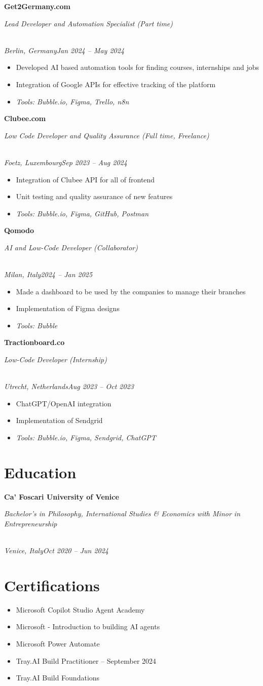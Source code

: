 \documentclass[a4paper,10pt]{article}
\newcommand{\role}[4]{\vspace{3pt}\noindent\hspace{0.6em}\parbox[t]{0.38\textwidth}{\raggedright\textbf{#1}}\hfill\parbox[t]{0.58\textwidth}{\raggedleft\textit{#2}}\\{\textit{#3}\hfill\textit{#4}}\vspace{1pt}}
\begin{document}
\role{Get2Germany.com}{Lead Developer and Automation Specialist (Part time)}{Berlin, Germany}{Jan 2024 -- May 2024}
\begin{itemize}
\item Developed AI based automation tools for finding courses, internships and jobs
\item Integration of Google APIs for effective tracking of the platform
\item \textit{Tools: Bubble.io, Figma, Trello, n8n}
\end{itemize}

\role{Clubee.com}{Low Code Developer and Quality Assurance (Full time, Freelance)}{Foetz, Luxembourg}{Sep 2023 -- Aug 2024}
\begin{itemize}
\item Integration of Clubee API for all of frontend
\item Unit testing and quality assurance of new features
\item \textit{Tools: Bubble.io, Figma, GitHub, Postman}
\end{itemize}

\role{Qomodo}{AI and Low-Code Developer (Collaborator)}{Milan, Italy}{2024 -- Jan 2025}
\begin{itemize}
\item Made a dashboard to be used by the companies to manage their branches
\item Implementation of Figma designs
\item \textit{Tools: Bubble}
\end{itemize}

\role{Tractionboard.co}{Low-Code Developer (Internship)}{Utrecht, Netherlands}{Aug 2023 -- Oct 2023}
\begin{itemize}
\item ChatGPT/OpenAI integration
\item Implementation of Sendgrid
\item \textit{Tools: Bubble.io, Figma, Sendgrid, ChatGPT}
\end{itemize}

\section{Education}
\role{Ca' Foscari University of Venice}{Bachelor's in Philosophy, International Studies \& Economics with Minor in Entrepreneurship}{Venice, Italy}{Oct 2020 -- Jun 2024}

\section{Certifications}
\begin{itemize}
\item Microsoft Copilot Studio Agent Academy
\item Microsoft - Introduction to building AI agents
\item Microsoft Power Automate
\item Tray.AI Build Practitioner -- September 2024
\item Tray.AI Build Foundations
\end{itemize}
\end{document}
